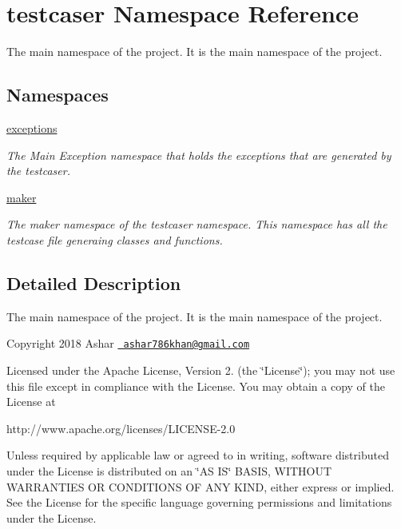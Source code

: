 \hypertarget{namespacetestcaser}{}\section{testcaser Namespace Reference}
\label{namespacetestcaser}


The main namespace of the project. It is the main namespace of the project.  


\subsection*{Namespaces}
\begin{DoxyCompactItemize}
\item 
 \mbox{\hyperlink{namespacetestcaser_1_1exceptions}{exceptions}}
\begin{DoxyCompactList}\small\item\em The Main Exception namespace that holds the exceptions that are generated by the testcaser. \end{DoxyCompactList}\item 
 \mbox{\hyperlink{namespacetestcaser_1_1maker}{maker}}
\begin{DoxyCompactList}\small\item\em The maker namespace of the testcaser namespace. This namespace has all the testcase file generaing classes and functions. \end{DoxyCompactList}\end{DoxyCompactItemize}


\subsection{Detailed Description}
The main namespace of the project. It is the main namespace of the project. 

Copyright 2018 Ashar 
\href{mailto:ashar786khan@gmail.com}{\texttt{ ashar786khan@gmail.\+com}}

Licensed under the Apache License, Version 2. (the \char`\"{}\+License\char`\"{}); you may not use this file except in compliance with the License. You may obtain a copy of the License at \begin{DoxyVerb}http://www.apache.org/licenses/LICENSE-2.0
\end{DoxyVerb}


Unless required by applicable law or agreed to in writing, software distributed under the License is distributed on an \char`\"{}\+A\+S I\+S\char`\"{} B\+A\+S\+IS, W\+I\+T\+H\+O\+UT W\+A\+R\+R\+A\+N\+T\+I\+ES OR C\+O\+N\+D\+I\+T\+I\+O\+NS OF A\+NY K\+I\+ND, either express or implied. See the License for the specific language governing permissions and limitations under the License. 